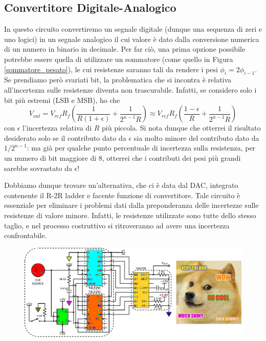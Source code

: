 \subsection{Convertitore Digitale-Analogico}

In questo circuito convertiremo un segnale digitale (dunque una sequenza di zeri e uno logici) in un segnale analogico il cui valore è dato dalla conversione numerica di un numero in binario in decimale. Per far ciò, una prima opzione possibile potrebbe essere quella di utilizzare un sommatore (come quello in Figura \ref{sommatore_pesato}), le cui resistenze saranno tali da rendere i pesi $\phi_i = 2 \phi_{i -1}$. Se prendiamo però svariati bit, la problematica che si incontra è relativa all'incertezza sulle resistenze diventa non trascurabile. Infatti, se considero solo i bit più estremi (LSB e MSB), ho che
$$V_{out}=V_{ref} R_f \left( \frac{1}{R (1 + \epsilon)} + \frac{1}{2^{n-1}R}\right) \approx V_{ref} R_f \left( \frac{1 - \epsilon}{R} + \frac{1}{2^{n-1}R}\right)$$
con $\epsilon$ l'incertezza relativa di $R$ più piccola. Si nota dunque che otterrei il risultato desiderato solo se il contributo dato da $\epsilon$ sia molto minore del contributo dato da $1/2^{n-1}$: ma già per qualche punto percentuale di incertezza sulla resistenza, per un numero di bit maggiore di 8, otterrei che i contributi dei pesi più grandi sarebbe sovrastato da $\epsilon$!

Dobbiamo dunque trovare un'alternativa, che ci è data dal DAC, integrato contenente il R-2R ladder e facente funzione di convertitore. Tale circuito è essenziale per eliminare i problemi dati dalla preponderanza delle incertezze sulle resistenze di valore minore. Infatti, le resistenze utilizzate sono tutte dello stesso taglio, e nel processo costruttivo si ritroveranno ad avere una incertezza confrontabile.

\begin{figure}[htpc]
\centering
	\includegraphics[width=.95\textwidth]{../E12/latex/specialDAC.pdf}
	\caption{}
	\label{cir12:DAC}
\end{figure}

